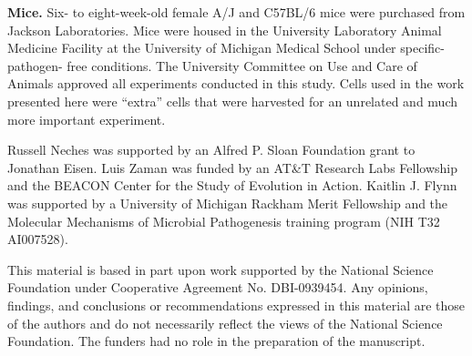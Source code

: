 \documentclass[fleqn,10pt]{wlpeerj}
\begin{document}
{\bf Mice.} Six- to eight-week-old female A/J and C57BL/6 mice were purchased
from Jackson Laboratories. Mice were housed in the University Laboratory
Animal Medicine Facility at the University of Michigan Medical School under
specific-pathogen- free conditions. The University Committee on Use and Care
of Animals approved all experiments conducted in this study. Cells used in the
work presented here were ``extra'' cells that were harvested for an unrelated
and much more important experiment.

 Russell Neches was supported by an Alfred P. Sloan
Foundation grant to Jonathan Eisen. Luis Zaman was funded by an AT\&T Research
Labs Fellowship and the BEACON Center for the Study of Evolution in Action.
Kaitlin J. Flynn was supported by a University of Michigan Rackham Merit
Fellowship and the Molecular Mechanisms of Microbial Pathogenesis training
program (NIH T32 AI007528).

\noindent This material is based in part upon work supported by the National
Science Foundation under Cooperative Agreement No. DBI-0939454. Any opinions,
findings, and conclusions or recommendations expressed in this material are
those of the authors and do not necessarily reflect the views of the National
Science Foundation. The funders had no role in the preparation of the
manuscript.



\end{document}
